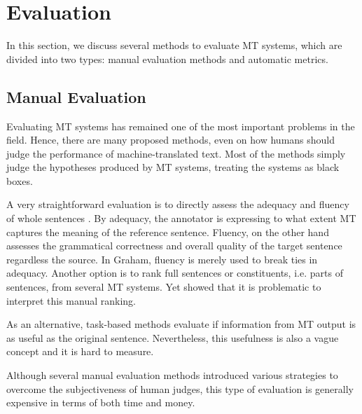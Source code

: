 \section{Evaluation}
\label{the-eval}

In this section, we discuss several methods to evaluate MT systems, which are divided into two types: manual evaluation methods and automatic metrics.

\subsection{Manual Evaluation}
\label{the-eval-manual}
Evaluating MT systems has remained one of the most important problems in the field.
Hence, there are many proposed methods, even on how humans should judge the performance of machine-translated text.
Most of the methods simply judge the hypotheses produced by MT systems, treating the systems as black boxes.

A very straightforward evaluation is to directly assess the adequacy and fluency of whole sentences \citep{DBLP:conf/acllaw/GrahamBMZ13}.
By adequacy, the annotator is expressing to what extent MT captures the meaning of the reference sentence.
Fluency, on the other hand assesses the grammatical correctness and overall quality of the target sentence regardless the source.
In Graham, fluency is merely used to break ties in adequacy.
Another option is to rank full sentences or constituents, i.e. parts of sentences, from several MT systems.
Yet \cite{DBLP:conf/wmt/BojarEPZ11} showed that it is problematic to interpret this manual ranking.


As an alternative, task-based methods evaluate if information from MT output is as useful as the original sentence.
Nevertheless, this usefulness is also a vague concept and it is hard to measure.


Although several manual evaluation methods introduced various strategies to overcome the subjectiveness of human judges, this type of evaluation is generally expensive in terms of both time and money.

